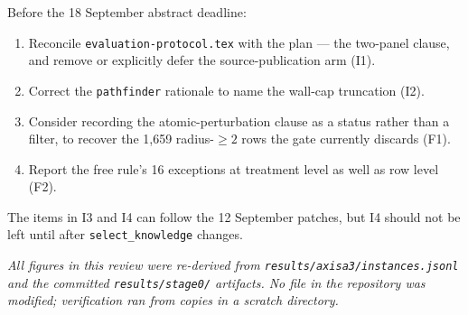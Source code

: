 \documentclass[11pt,a4paper]{article}
\newcommand{\code}[1]{\texttt{\small\hspace{0pt}#1}}
\begin{document}
Before the 18 September abstract deadline:
\begin{enumerate}[leftmargin=1.4em,itemsep=0.15em]
\item Reconcile \code{evaluation-protocol.tex} with the plan --- the two-panel clause, and remove
or explicitly defer the source-publication arm (I1).
\item Correct the \code{pathfinder} rationale to name the wall-cap truncation (I2).
\item Consider recording the atomic-perturbation clause as a status rather than a filter, to
recover the 1{,}659 radius-$\geq 2$ rows the gate currently discards (F1).
\item Report the free rule's 16 exceptions at treatment level as well as row level (F2).
\end{enumerate}

The items in I3 and I4 can follow the 12 September patches, but I4 should not be left until after
\code{select\_knowledge} changes.

\vfill
{\small\textit{All figures in this review were re-derived from \code{results/\discretionary{}{}{}axisa3/\discretionary{}{}{}instances.jsonl}
and the committed \code{results/stage0/} artifacts. No file in the repository was modified;
verification ran from copies in a scratch directory.}}
\end{document}
